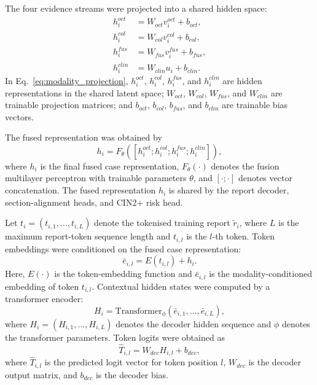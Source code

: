 The four evidence streams were projected into a shared hidden space:
\begin{align}
h_i^{oct} &= W_{oct}v_i^{oct}+b_{oct},\\
h_i^{col} &= W_{col}v_i^{col}+b_{col},\\
h_i^{fus} &= W_{fus}v_i^{fus}+b_{fus},\\
h_i^{clin} &= W_{clin}u_i+b_{clin}.
\label{eq:modality_projection}
\end{align}
In Eq.~\eqref{eq:modality_projection}, \(h_i^{oct}\), \(h_i^{col}\), \(h_i^{fus}\), and \(h_i^{clin}\) are hidden representations in the shared latent space; \(W_{oct}\), \(W_{col}\), \(W_{fus}\), and \(W_{clin}\) are trainable projection matrices; and \(b_{oct}\), \(b_{col}\), \(b_{fus}\), and \(b_{clin}\) are trainable bias vectors.

The fused representation was obtained by
\begin{equation}
h_i=F_{\theta}\left([h_i^{oct};h_i^{col};h_i^{fus};h_i^{clin}]\right),
\label{eq:fusion}
\end{equation}
where \(h_i\) is the final fused case representation, \(F_{\theta}(\cdot)\) denotes the fusion multilayer perceptron with trainable parameters \(\theta\), and \([\cdot;\cdot]\) denotes vector concatenation. The fused representation \(h_i\) is shared by the report decoder, section-alignment heads, and CIN2+ risk head.

Let \(t_i=(t_{i,1},\ldots,t_{i,L})\) denote the tokenised training report \(\tilde{r}_i\), where \(L\) is the maximum report-token sequence length and \(t_{i,l}\) is the \(l\)-th token. Token embeddings were conditioned on the fused case representation:
\begin{equation}
\bar{e}_{i,l}=E(t_{i,l})+h_i.
\label{eq:conditioned_token}
\end{equation}
Here, \(E(\cdot)\) is the token-embedding function and \(\bar{e}_{i,l}\) is the modality-conditioned embedding of token \(t_{i,l}\). Contextual hidden states were computed by a transformer encoder:
\begin{equation}
H_i=\mathrm{Transformer}_{\phi}(\bar{e}_{i,1},\ldots,\bar{e}_{i,L}),
\label{eq:transformer_hidden}
\end{equation}
where \(H_i=(H_{i,1},\ldots,H_{i,L})\) denotes the decoder hidden sequence and \(\phi\) denotes the transformer parameters. Token logits were obtained as
\begin{equation}
\hat{T}_{i,l}=W_{dec}H_{i,l}+b_{dec},
\label{eq:token_logits}
\end{equation}
where \(\hat{T}_{i,l}\) is the predicted logit vector for token position \(l\), \(W_{dec}\) is the decoder output matrix, and \(b_{dec}\) is the decoder bias.

